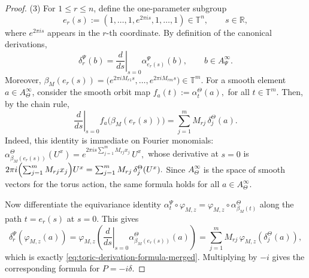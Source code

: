 \documentclass[11pt]{amsart}
\theoremstyle{definition}
\theoremstyle{remark}
\newcommand{\T}{\mathbb{T}}
\newcommand{\R}{\mathbb{R}}
\begin{document}
\begin{proof}
(3)  For $1\le r\le n$, define the
one-parameter subgroup
\[
e_r(s):=(1,\ldots,1,e^{2\pi is},1,\ldots,1)\in\T^n,
\qquad s\in\R,
\]
where $e^{2\pi is}$ appears in the $r$-th coordinate. By definition of the
canonical derivations,
\[
\delta_r^\Psi(b)
=
\left.\frac{d}{ds}\right|_{s=0}\alpha_{e_r(s)}^\Psi(b),
\qquad
b\in A_\Psi^\infty.
\]
Moreover, $\beta_M(e_r(s))=\bigl(e^{2\pi iM_{r1}s},\ldots,e^{2\pi iM_{rm}s}\bigr)\in\T^m.$
For a smooth element $a\in A_\Theta^\infty$, consider the smooth orbit map
$f_a(t):=\alpha_t^\Theta(a),$ for all $t\in\T^m.$
Then, by the chain rule,
\[
\left.\frac{d}{ds}\right|_{s=0}
f_a\bigl(\beta_M(e_r(s))\bigr)
=
\sum_{j=1}^m M_{rj}\,\delta_j^\Theta(a).
\]
Indeed, this identity is immediate on Fourier monomials:
$
\alpha_{\beta_M(e_r(s))}^\Theta(U^x)
=
e^{2\pi i s\sum_{j=1}^mM_{rj}x_j}\,U^x,$ whose derivative at \(s=0\) is $2\pi i\Bigl(\sum_{j=1}^mM_{rj}x_j\Bigr)U^x
=
\sum_{j=1}^mM_{rj}\,\delta_j^\Theta(U^x).$
Since $A_\Theta^\infty$ is the space of smooth vectors for the torus action,
the same formula holds for all $a\in A_\Theta^\infty$.

Now differentiate the equivariance identity $\alpha_t^\Psi\circ\varphi_{M,z}=\varphi_{M,z}\circ \alpha_{\beta_M(t)}^\Theta$
along the path $t=e_r(s)$ at $s=0$. This gives
\[
\delta_r^\Psi(\varphi_{M,z}(a))
=
\varphi_{M,z}\!\left(
\left.\frac{d}{ds}\right|_{s=0}\alpha_{\beta_M(e_r(s))}^\Theta(a)
\right)
=
\sum_{j=1}^m M_{rj}\,\varphi_{M,z}(\delta_j^\Theta(a)),
\]
which is exactly \eqref{eq:toric-derivation-formula-merged}. Multiplying by
$-i$ gives the corresponding formula for $P=-i\delta$. \end{proof}
\end{document}

